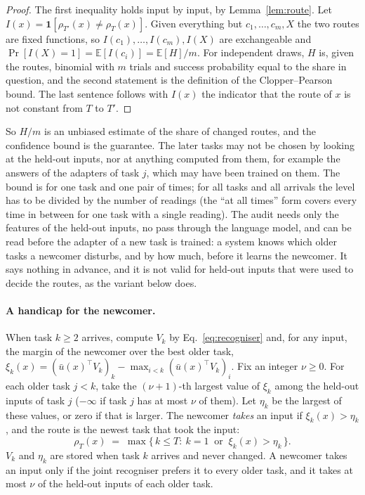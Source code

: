 \begin{proof}
The first inequality holds input by input, by Lemma~\ref{lem:route}. Let
$I(x) = \mathbf{1}[\rho_{T'}(x) \ne \rho_T(x)]$. Given everything but $c_1, \dots, c_m, X$ the two
routes are fixed functions, so $I(c_1), \dots, I(c_m), I(X)$ are exchangeable
and $\Pr[I(X) = 1] = \mathbb{E}[I(c_i)] = \mathbb{E}[H]/m$. For independent draws, $H$ is, given
the routes, binomial with $m$ trials and success probability equal to the share in question, and
the second statement is the definition of the Clopper--Pearson bound. The last sentence follows
with $I(x)$ the indicator that the route of $x$ is not constant from $T$ to $T'$.
\end{proof}

So $H/m$ is an unbiased estimate of the share of changed routes, and the confidence bound is the
guarantee. The later tasks may not be chosen by looking at the held-out inputs, nor at anything
computed from them, for example the answers of the adapters of task $j$, which may have been
trained on them. The bound is for one task and one pair of times; for all tasks and all arrivals
the level has to be divided by the number of readings (the ``at all times'' form covers every time in between for one task with a single reading). The audit needs only the features of the
held-out inputs, no pass through the language model, and can be read before the adapter of a new
task is trained: a system knows which older tasks a newcomer disturbs, and by how much, before it
learns the newcomer. It says nothing in advance, and it is not valid for held-out inputs that were
used to decide the routes, as the variant below does.

\paragraph{A handicap for the newcomer.} When task $k \ge 2$ arrives, compute $V_k$ by
Eq.~\eqref{eq:recogniser} and, for any input, the margin of the newcomer over the best older task,
$\xi_k(x) = (\bar u(x)^{\!\top} V_k)_k - \max_{i < k} (\bar u(x)^{\!\top} V_k)_i$. Fix an integer
$\nu \ge 0$. For each older task $j < k$, take the $(\nu+1)$-th largest value of $\xi_k$ among the
held-out inputs of task $j$ ($-\infty$ if task $j$ has at most $\nu$ of them). Let $\eta_k$ be the
largest of these values, or zero if that is larger. The newcomer \emph{takes} an input if
$\xi_k(x) > \eta_k$, and the route is the newest task that took the input:
\begin{equation}
  \rho_T(x) \;=\; \max\bigl\{\, k \le T : \ k = 1 \ \text{ or } \ \xi_k(x) > \eta_k \,\bigr\} .
  \label{eq:handicap}
\end{equation}
$V_k$ and $\eta_k$ are stored when task $k$ arrives and never changed. A newcomer takes an input
only if the joint recogniser prefers it to every older task, and it takes at most $\nu$ of the
held-out inputs of each older task.

